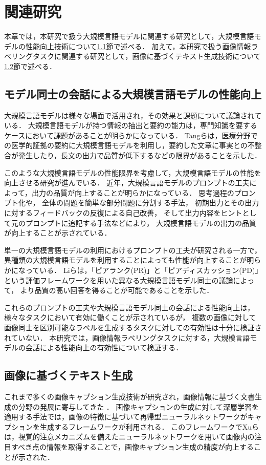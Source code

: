 \documentclass[a4paper,11pt]{jreport}
\begin{document}
\chapter{関連研究}
本章では，本研究で扱う大規模言語モデルに関連する研究として，大規模言語モデルの性能向上技術について\ref{sec:fine_tune_llm}節で述べる．
加えて，本研究で扱う画像情報ラベリングタスクに関連する研究として，画像に基づくテキスト生成技術について\ref{sec:relwork_image_captioning}節で述べる．

\section{モデル同士の会話による大規模言語モデルの性能向上}
\label{sec:fine_tune_llm}
大規模言語モデルは様々な場面で活用され，その効果と課題について議論されている．
大規模言語モデルが持つ情報の抽出と要約の能力は，専門知識を要するケースにおいて課題があることが明らかになっている．
Tangら\cite{Tang2023}は，医療分野での医学的証拠の要約に大規模言語モデルを利用し，要約した文章に事実との不整合が発生したり，長文の出力で品質が低下するなどの限界があることを示した．

このような大規模言語モデルの性能限界を考慮して，大規模言語モデルの性能を向上させる研究が進んでいる．
近年，大規模言語モデルのプロンプトの工夫によって，出力の品質が向上することが明らかになっている．
思考過程のプロンプト化\cite{Wei2022}や，
全体の問題を簡単な部分問題に分割する手法\cite{Zhou2022}，
初期出力とその出力に対するフィードバックの反復による自己改善\cite{Madaan2023}，
そして出力内容をヒントとして元のプロンプトに追記する手法\cite{Zheng2023}などにより，
大規模言語モデルの出力の品質が向上することが示されている．

単一の大規模言語モデルの利用におけるプロンプトの工夫が研究される一方で，
異種類の大規模言語モデルを利用することによっても性能が向上することが明らかになっている．
Liら\cite{LiRuosen2023}は，「ピアランク(PR)」と「ピアディスカッション(PD)」という評価フレームワークを用いた異なる大規模言語モデル同士の議論によって，
より品質の高い回答を得ることが可能であることを示した．

これらのプロンプトの工夫や大規模言語モデル同士の会話による性能向上は，
様々なタスクにおいて有効に働くことが示されているが，
複数の画像に対して画像同士を区別可能なラベルを生成するタスクに対しての有効性は十分に検証されていない．
本研究では，画像情報ラベリングタスクに対する，大規模言語モデルの会話による性能向上の有効性について検証する．

\section{画像に基づくテキスト生成}
\label{sec:relwork_image_captioning}
これまで多くの画像キャプション生成技術が研究され，画像情報に基づく文書生成の分野の発展に寄与してきた \cite{Farhadi2010}．
画像キャプションの生成に対して深層学習を適用する手法では，画像の特徴に基づいて再帰型ニューラルネットワークがキャプションを生成するフレームワークが利用される\cite{Vinyals2017}．
このフレームワークでXuら\cite{Xu2015}は，視覚的注意メカニズムを備えたニューラルネットワークを用いて画像内の注目すべき点の情報を取得することで，画像キャプション生成の精度が向上することが示された．
\end{document}
